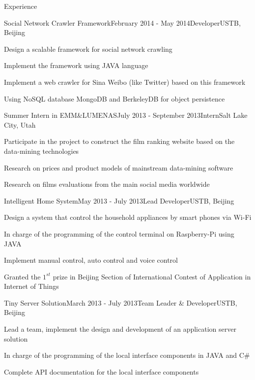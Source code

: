 \documentclass{resume} %
\begin{document}
\begin{rSection}{Experience}

\begin{rSubsection}{Social Network Crawler Framework}{February 2014 - May 2014}{Developer}{USTB, Beijing}
\item Design a scalable framework for social network crawling
\item Implement the framework using JAVA language
\item Implement a web crawler for Sina Weibo (like Twitter) based on this framework
\item Using NoSQL database MongoDB and BerkeleyDB for object persistence
\end{rSubsection}


\begin{rSubsection}{Summer Intern in EMM\&LUMENAS}{July 2013 - September 2013}{Intern}{Salt Lake City, Utah}
\item Participate in the project to construct the film ranking website based on the data-mining
technologies
\item Research on prices and product models of mainstream data-mining software
\item Research on films evaluations from the main social media worldwide
\end{rSubsection}


\begin{rSubsection}{Intelligent Home System}{May 2013 - July 2013}{Lead Developer}{USTB, Beijing}
\item Design a system that control the household appliances by smart phones via Wi-Fi
\item In charge of the programming of the control terminal on Raspberry-Pi using JAVA
\item Implement manual control, auto control and voice control
\item Granted the $1^{st}$ prize in Beijing Section of International Contest of Application in Internet of Things
\end{rSubsection}


\begin{rSubsection}{Tiny Server Solution}{March 2013 - July 2013}{Team Leader \& Developer}{USTB, Beijing}
\item Lead a team, implement the design and development of an application server solution
\item In charge of the programming of the local interface components in JAVA and C\#
\item Complete API documentation for the local interface components
\end{rSubsection}

\end{rSection}
\end{document}
